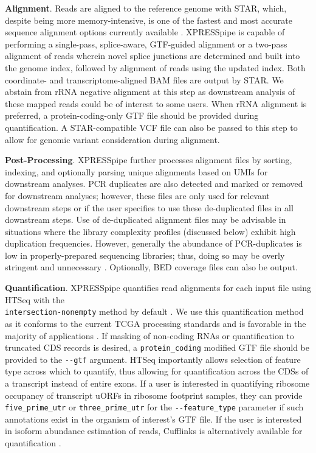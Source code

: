 \documentclass[10pt, oneside]{article}
\begin{document}
\noindent\textbf{Alignment}. Reads are aligned to the reference genome with STAR, which, despite being more memory-intensive, is one of the fastest and most accurate sequence alignment options currently available \cite{star, alignment_benchmark, alignment_benchmark2}. XPRESSpipe is capable of performing a single-pass, splice-aware, GTF-guided alignment or a two-pass alignment of reads wherein novel splice junctions are determined and built into the genome index, followed by alignment of reads using the updated index. Both coordinate- and transcriptome-aligned BAM files are output by STAR. We abstain from rRNA negative alignment at this step as downstream analysis of these mapped reads could be of interest to some users. When rRNA alignment is preferred, a protein-coding-only GTF file should be provided during quantification. A STAR-compatible VCF file can also be passed to this step to allow for genomic variant consideration during alignment.\par

\noindent\textbf{Post-Processing}. XPRESSpipe further processes alignment files by sorting, indexing, and optionally parsing unique alignments based on UMIs for downstream analyses. PCR duplicates are also detected and marked or removed for downstream analyses; however, these files are only used for relevant downstream steps or if the user specifies to use these de-duplicated files in all downstream steps. Use of de-duplicated alignment files may be advisable in situations where the library complexity profiles (discussed below) exhibit high duplication frequencies. However, generally the abundance of PCR-duplicates is low in properly-prepared sequencing libraries; thus, doing so may be overly stringent and unnecessary \cite{umi}. Optionally, BED coverage files can also be output.\par

\noindent\textbf{Quantification}. XPRESSpipe quantifies read alignments for each input file using HTSeq with the \\\texttt{intersection-nonempty} method by default \cite{htseq, count_benchmark}. We use this quantification method as it conforms to the current TCGA processing standards and is favorable in the majority of applications \cite{tcga}. If masking of non-coding RNAs or quantification to truncated CDS records is desired, a \texttt{protein\_coding} modified GTF file should be provided to the \texttt{-{}-gtf} argument. HTSeq importantly allows selection of feature type across which to quantify, thus allowing for quantification across the CDSs of a transcript instead of entire exons. If a user is interested in quantifying ribosome occupancy of transcript uORFs in ribosome footprint samples, they can provide \texttt{five\_prime\_utr} or \texttt{three\_prime\_utr} for the \texttt{-{}-feature\_type} parameter if such annotations exist in the organism of interest's GTF file. If the user is interested in isoform abundance estimation of reads, Cufflinks is alternatively available for quantification \cite{cufflinks, count_benchmark}.\par
\end{document}
